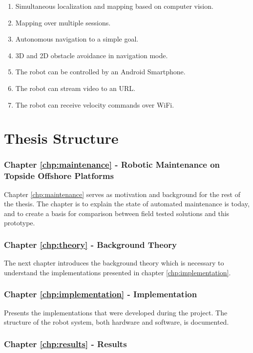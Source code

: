 \begin{enumerate}
\item Simultaneous localization and mapping based on computer vision.
\item Mapping over multiple sessions.
\item Autonomous navigation to a simple goal.
\item 3D and 2D obstacle avoidance in navigation mode.
\item The robot can be controlled by an Android Smartphone.
\item The robot can stream video to an URL.
\item The robot can receive velocity commands over WiFi.
\end{enumerate} 



\section{Thesis Structure}

\subsubsection{Chapter \ref{chp:maintenance} - Robotic Maintenance on Topside Offshore Platforms} 

Chapter \ref{chp:maintenance} serves as motivation and background for the rest of the thesis. The chapter is to explain the state of automated maintenance is today, and to create a basis for comparison between field tested solutions and this prototype.

\subsubsection{Chapter \ref{chp:theory} - Background Theory}
The next chapter introduces the background theory which is necessary to understand the implementations presented in chapter \ref{chp:implementation}. 

\subsubsection{Chapter \ref{chp:implementation} - Implementation}
Presents the implementations that were developed during the project. The structure of the robot system, both hardware and software, is documented.

\subsubsection{Chapter \ref{chp:results} - Results}

